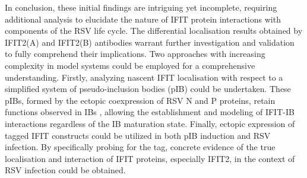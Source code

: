 In conclusion, these initial findings are intriguing yet incomplete, requiring additional analysis to elucidate the nature of IFIT protein interactions with components of the RSV life cycle. The differential localisation results obtained by IFIT2(A) and IFIT2(B) antibodies warrant further investigation and validation to fully comprehend their implications. Two approaches with increasing complexity in model systems could be employed for a comprehensive understanding. Firstly, analyzing nascent IFIT localisation with respect to a simplified system of pseudo-inclusion bodies (pIB) could be undertaken. These pIBs, formed by the ectopic coexpression of RSV N and P proteins, retain functions observed in IBs \cite{Rincheval2017FunctionalVirus, Galloux2020MinimalVitro, Jobe2020RespiratorySignaling}, allowing the establishment and modeling of IFIT-IB interactions regardless of the IB maturation state. Finally, ectopic expression of tagged IFIT constructs could be utilized in both pIB induction and RSV infection. By specifically probing for the tag, concrete evidence of the true localisation and interaction of IFIT proteins, especially IFIT2, in the context of RSV infection could be obtained.

